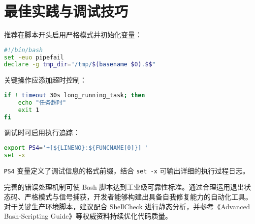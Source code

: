 \chapter{最佳实践与调试技巧}
推荐在脚本开头启用严格模式并初始化变量：\par
\begin{lstlisting}[language=bash]
#!/bin/bash
set -euo pipefail
declare -g tmp_dir="/tmp/$(basename $0).$$"
\end{lstlisting}
关键操作应添加超时控制：\par
\begin{lstlisting}[language=bash]
if ! timeout 30s long_running_task; then
    echo "任务超时"
    exit 1
fi
\end{lstlisting}
调试时可启用执行追踪：\par
\begin{lstlisting}[language=bash]
export PS4='+[${LINENO}:${FUNCNAME[0]}] '
set -x
\end{lstlisting}
\verb!PS4! 变量定义了调试信息的格式前缀，结合 \verb!set -x! 可输出详细的执行过程日志。\par
完善的错误处理机制可使 Bash 脚本达到工业级可靠性标准。通过合理运用退出状态码、严格模式与信号捕获，开发者能够构建出具备自我修复能力的自动化工具。对于关键生产环境脚本，建议配合 ShellCheck 进行静态分析，并参考《Advanced Bash-Scripting Guide》等权威资料持续优化代码质量。\par
